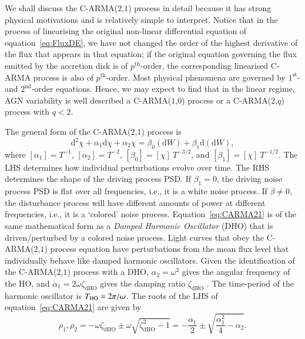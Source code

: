\documentclass[a4paper,fleqn,usenatbib]{mnras}
\begin{document}
We shall discuss the C-ARMA($2$,$1$) process in detail because it has strong physical motivations and is relatively simple to interpret. Notice that in the process of linearising the original non-linear differential equation of equation~\eqref{eq:FluxDE}, we have not changed the order of the highest derivative of the flux that appears in that equation; if the original equation governing the flux emitted by the accretion disk is of $p^{\mathrm{th}}$-order, the corresponding linearised C-ARMA process is also of $p^{\mathrm{th}}$-order. Most physical phenomena are governed by $1^{\mathrm{st}}$- and  $2^{\mathrm{nd}}$-order equations. Hence, we may expect to find that in the linear regime, AGN variability is well described a C-ARMA($1$,$0$) process or a C-ARMA($2$,$q$) process with $q < 2$. 

The general form of the C-ARMA($2$,$1$) process is
\begin{equation}\label{eq:CARMA21}
\mathrm{d}^{2}\chi + \alpha_{1} \mathrm{d}\chi + \alpha_{2} \chi = \beta_{0}(\mathrm{d}W) + \beta_{1} \mathrm{d}(\mathrm{d}W),
\end{equation}
where $[\alpha_{1}] = T^{-1}$, $[\alpha_{2}] = T^{-2}$, $[\beta_{0}] = [\chi]~T^{-3/2}$, and $[\beta_{1}] = [\chi]~T^{-1/2}$. The LHS determines how individual perturbations evolve over time. The RHS determines the shape of the driving process PSD. If $\beta_{1} = 0$, the driving noise process PSD is flat over all frequencies, i.e., it is a white noise process. If $\beta \neq 0$, the disturbance process will have different amounts of power at different frequencies, i.e., it is a `colored' noise process. Equation~\eqref{eq:CARMA21} is of the same mathematical form as a \textit{Damped Harmonic Oscillator} (DHO) that is driven/perturbed by a colored noise process. Light curves that obey the C-ARMA($2$,$1$) process equation have perturbations from the mean flux level that individually behave like damped harmonic oscillators.
Given the identification of the  C-ARMA($2$,$1$) process with a DHO, $\alpha_{2} = \omega^{2}$ gives the angular frequency of the HO, and $\alpha_{1} = 2\omega\zeta_{\mathrm{dHO}}$ gives the damping ratio $\zeta_{\mathrm{dHO}}$ \citep[see chapter~7 for notation]{PanditWu}. The time-period of the harmonic oscillator is $T_{\mathrm{HO}} = 2 \pi/\omega$. The roots of the LHS of equation~\eqref{eq:CARMA21} are given by
\begin{equation}\label{eq:CARMA21Roots}
\rho_{1},\rho_{2} = -\omega\zeta_{\mathrm{dHO}} \pm \omega \sqrt{\zeta_{\mathrm{dHO}}^{2} - 1} = -\frac{\alpha_{1}}{2} \pm \sqrt{\frac{\alpha_{1}^{2}}{4} - \alpha_{2}}.
\end{equation}
\end{document}
